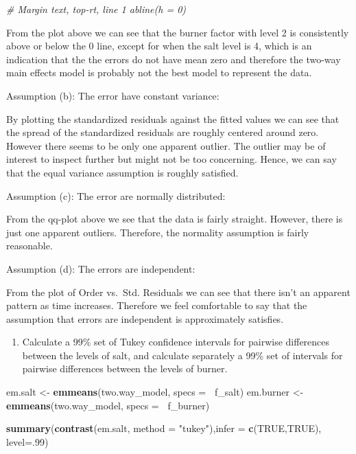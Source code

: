 \documentclass[12pt,]{article}
\newenvironment{Shaded}{\begin{snugshade}}{\end{snugshade}}
\newcommand{\KeywordTok}[1]{\textcolor[rgb]{0.13,0.29,0.53}{\textbf{#1}}}
\newcommand{\DataTypeTok}[1]{\textcolor[rgb]{0.13,0.29,0.53}{#1}}
\newcommand{\DecValTok}[1]{\textcolor[rgb]{0.00,0.00,0.81}{#1}}
\newcommand{\StringTok}[1]{\textcolor[rgb]{0.31,0.60,0.02}{#1}}
\newcommand{\CommentTok}[1]{\textcolor[rgb]{0.56,0.35,0.01}{\textit{#1}}}
\newcommand{\OtherTok}[1]{\textcolor[rgb]{0.56,0.35,0.01}{#1}}
\newcommand{\OperatorTok}[1]{\textcolor[rgb]{0.81,0.36,0.00}{\textbf{#1}}}
\newcommand{\NormalTok}[1]{#1}
\providecommand{\tightlist}{%
  \setlength{\itemsep}{0pt}\setlength{\parskip}{0pt}}
\begin{document}
\begin{Shaded}
\begin{Highlighting}[]
 \CommentTok{# Margin text, top-rt, line 1 abline(h = 0)}
\end{Highlighting}
\end{Shaded}

From the plot above we can see that the burner factor with level 2 is
consistently above or below the 0 line, except for when the salt level
is 4, which is an indication that the the errors do not have mean zero
and therefore the two-way main effects model is probably not the best
model to represent the data.

Assumption (b): The error have constant variance:

By plotting the standardized residuals against the fitted values we can
see that the spread of the standardized residuals are roughly centered
around zero. However there seems to be only one apparent outlier. The
outlier may be of interest to inspect further but might not be too
concerning. Hence, we can say that the equal variance assumption is
roughly satisfied.

Assumption (c): The error are normally distributed:

From the qq-plot above we see that the data is fairly straight. However,
there is just one apparent outliers. Therefore, the normality assumption
is fairly reasonable.

Assumption (d): The errors are independent:

From the plot of Order vs.~Std. Residuals we can see that there isn't an
apparent pattern as time increases. Therefore we feel comfortable to say
that the assumption that errors are independent is approximately
satisfies.

\begin{enumerate}
\def\labelenumi{(\alph{enumi})}
\setcounter{enumi}{1}
\tightlist
\item
  Calculate a 99\% set of Tukey confidence intervals for pairwise
  differences between the levels of salt, and calculate separately a
  99\% set of intervals for pairwise differences between the levels of
  burner.
\end{enumerate}

\begin{Shaded}
\begin{Highlighting}[]
\NormalTok{em.salt <-}\StringTok{ }\KeywordTok{emmeans}\NormalTok{(two.way_model, }\DataTypeTok{specs =} \OperatorTok{~}\NormalTok{f_salt)}
\NormalTok{em.burner <-}\StringTok{ }\KeywordTok{emmeans}\NormalTok{(two.way_model, }\DataTypeTok{specs =} \OperatorTok{~}\NormalTok{f_burner)}

\KeywordTok{summary}\NormalTok{(}\KeywordTok{contrast}\NormalTok{(em.salt, }\DataTypeTok{method =} \StringTok{"tukey"}\NormalTok{),}\DataTypeTok{infer =} \KeywordTok{c}\NormalTok{(}\OtherTok{TRUE}\NormalTok{,}\OtherTok{TRUE}\NormalTok{), }\DataTypeTok{level=}\NormalTok{.}\DecValTok{99}\NormalTok{)}
\end{Highlighting}
\end{Shaded}
\end{document}
